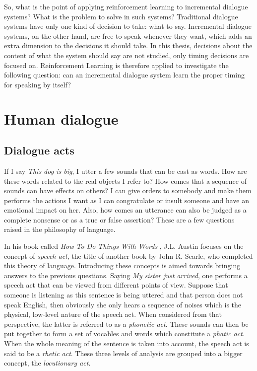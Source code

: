         So, what is the point of applying reinforcement learning to incremental dialogue systems? What is the problem to solve in such systems? Traditional dialogue systems have only one kind of decision to take: what to say. Incremental dialogue systems, on the other hand, are free to speak whenever they want, which adds an extra dimension to the decisions it should take. In this thesis, decisions about the content of what the system should say are not studied, only timing decisions are focused on. Reinforcement Learning is therefore applied to investigate the following question: can an incremental dialogue system learn the proper timing for speaking by itself?

\section{Human dialogue}
	\subsection{Dialogue acts}
    \label{soa:dialogueacts}
    
    	If I say \textit{This dog is big}, I utter a few sounds that can be cast as words. How are these words related to the real objects I refer to? How comes that a sequence of sounds can have effects on others? I can give orders to somebody and make them performs the actions I want as I can congratulate or insult someone and have an emotional impact on her. Also, how comes an utterance can also be judged as a complete nonsense or as a true or false assertion? These are a few questions raised in the philosophy of language.
    
    	In his book called \textit{How To Do Things With Words} \cite{Austin1962}, J.L. Austin focuses on the concept of \textit{speech act}, the title of another book \cite{Searle1969} by John R. Searle, who completed this theory of language. Introducing these concepts is aimed towards bringing answers to the previous questions. Saying \textit{My sister just arrived}, one performs a speech act that can be viewed from different points of view. Suppose that someone is listening as this sentence is being uttered and that person does not speak English, then obviously she only hears a sequence of noises which is the physical, low-level nature of the speech act. When considered from that perspective, the latter is referred to as a \textit{phonetic act}. These sounds can then be put together to form a set of vocables and words which constitute a \textit{phatic act}. When the whole meaning of the sentence is taken into account, the speech act is said to be a \textit{rhetic act}. These three levels of analysis are grouped into a bigger concept, the \textit{locutionary act}.
			
